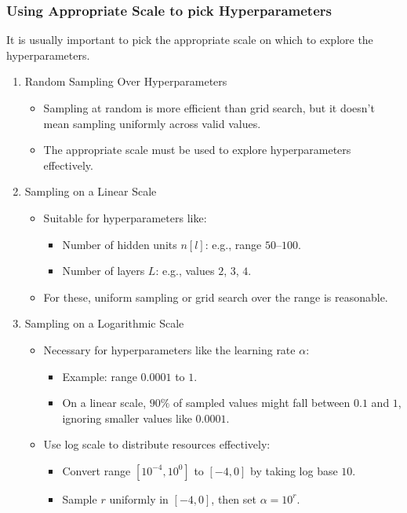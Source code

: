 \documentclass[letterpaper,12pt,notitlepage,twoside]{report}
\begin{document}
\subsubsection{Using Appropriate Scale to pick Hyperparameters}
It is usually important to pick the appropriate scale on which to explore the hyperparameters.
\begin{enumerate}[noitemsep, topsep=0pt]
\item Random Sampling Over Hyperparameters
\begin{itemize}
    \item Sampling at random is more efficient than grid search, but it doesn’t mean sampling uniformly across valid values.
    \item The appropriate scale must be used to explore hyperparameters effectively.
\end{itemize}

\item Sampling on a Linear Scale
\begin{itemize}
    \item Suitable for hyperparameters like:
    \begin{itemize}
        \item Number of hidden units $n[l]$: e.g., range $50$–$100$.
        \item Number of layers $L$: e.g., values $2$, $3$, $4$.
    \end{itemize}
    \item For these, uniform sampling or grid search over the range is reasonable.
\end{itemize}

\item Sampling on a Logarithmic Scale
\begin{itemize}
    \item Necessary for hyperparameters like the learning rate $\alpha$:
    \begin{itemize}
        \item Example: range $0.0001$ to $1$.
        \item On a linear scale, $90\%$ of sampled values might fall between $0.1$ and $1$, ignoring smaller values like $0.0001$.
    \end{itemize}
    \item Use log scale to distribute resources effectively:
    \begin{itemize}
        \item Convert range $[10^{-4}, 10^0]$ to $[-4, 0]$ by taking log base $10$.
        \item Sample $r$ uniformly in $[-4, 0]$, then set $\alpha = 10^r$.
    \end{itemize}
\end{itemize}


\end{enumerate}
\end{document}

